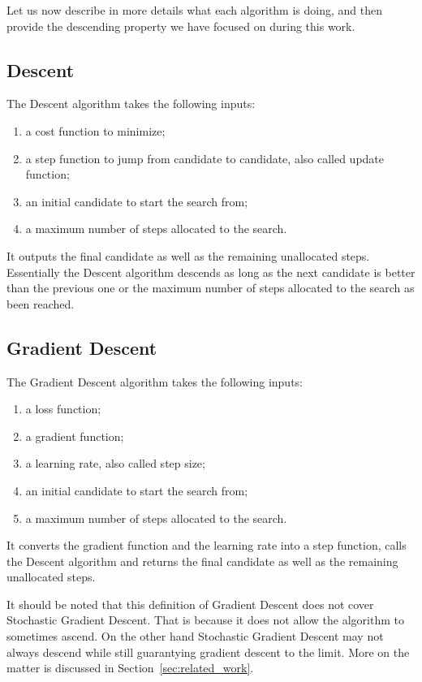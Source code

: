 \documentclass[]{report}
\begin{document}
Let us now describe in more details what each algorithm is doing, and
then provide the descending property we have focused on during this
work.

\subsection{Descent}
The Descent algorithm takes the following inputs:
\begin{enumerate}
\item a cost function to minimize;
\item a step function to jump from candidate to candidate, also called
  update function;
\item an initial candidate to start the search from;
\item a maximum number of steps allocated to the search.
\end{enumerate}
It outputs the final candidate as well as the remaining unallocated
steps.  Essentially the Descent algorithm descends as long as the next
candidate is better than the previous one or the maximum number of
steps allocated to the search as been reached.

\subsection{Gradient Descent}
The Gradient Descent algorithm takes the following inputs:
\begin{enumerate}
\item a loss function;
\item a gradient function;
\item a learning rate, also called step size;
\item an initial candidate to start the search from;
\item a maximum number of steps allocated to the search.
\end{enumerate}
It converts the gradient function and the learning rate into a step
function, calls the Descent algorithm and returns the final candidate
as well as the remaining unallocated steps.

It should be noted that this definition of Gradient Descent does not
cover Stochastic Gradient Descent.  That is because it does not allow
the algorithm to sometimes ascend.  On the other hand Stochastic
Gradient Descent may not always descend while still guarantying
gradient descent to the limit.  More on the matter is discussed in
Section~\ref{sec:related_work}.
\end{document}
